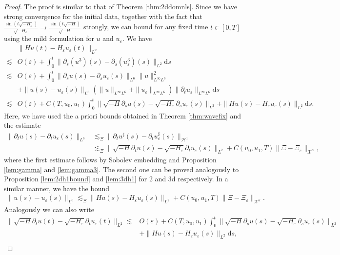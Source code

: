 \documentclass[11pt, oneside]{article}   	%
\newcommand{\mathd}{\mathrm{d}}
\newcommand{\ssp}{\mathscr{H}}
\begin{document}
\begin{proof}
The proof is similar to that of Theorem \ref{thm:2ddomnls}. Since we have strong convergence for the initial data, together with the fact that $\frac{\sin(t\sqrt{-H_\varepsilon})}{\sqrt{-H_\varepsilon}}\to\frac{\sin(t\sqrt{-H})}{\sqrt{-H}}$ strongly, we can bound for any fixed time $t\in[0,T]$ using the mild formulation for $u$ and $u_\varepsilon$.  We have
\begin{align*}
& \|Hu(t)-H_\varepsilon u_\varepsilon(t)\|_{L^2} \\ \lesssim& O(\varepsilon)+\int_{0}^{t}\|\partial_s(u^3)(s)-\partial_s(u^3_\varepsilon)(s)\|_{L^2}\mathd s\\
\lesssim& O(\varepsilon)+\int_{0}^{t}\|\partial_su(s)-\partial_su_\varepsilon(s)\|_{L^6}\|u\|^2_{L^\infty L^6}\\&+\|u(s)-u_\varepsilon(s)\|_{L^6}(\|u\|_{L^\infty L^6}+\|u_\varepsilon\|_{L^\infty L^6})\|\partial_t u_\varepsilon\|_{L^\infty L^6}\mathd s\\
\lesssim& O(\varepsilon)+C(T,u_0,u_1)\int_{0}^{t}\|\sqrt{-H}\partial_su(s)-\sqrt{-H_\varepsilon}\partial_su_\varepsilon(s)\|_{L^2}+\|Hu(s)-H_\varepsilon u_\varepsilon(s)\|_{L^2}\mathd s.
\end{align*}
Here,  we have used the a priori bounds obtained in Theorem \ref{thm:wavefix} and the estimate
\begin{align*}
\|\partial_t u(s)-\partial_t u_\varepsilon(s)\|_{L^6} & \lesssim_\Xi\|\partial_t u^\sharp(s)-\partial_t u^\sharp_\varepsilon(s)\|_{\ssp^1} \\
&\lesssim_\Xi \|\sqrt{-H}\partial_t u(s)-\sqrt{-H_\varepsilon}\partial_t u_\varepsilon(s)\|_{L^2}+C(u_0,u_1,T)\|\Xi-\Xi_\varepsilon\|_{\mathscr{X}^\alpha},
\end{align*}
where the first estimate follows by Sobolev embedding and Proposition \ref{lem:gamma} and \ref{lem:gamma3}. The second one can be proved analogously to Proposition \ref{lem:2dh1bound} and \ref{lem:3dh1} for 2 and 3d respectively. In a similar manner, we have the bound
\begin{align*}
\| u(s)-u_\varepsilon(s)\|_{L^6}\lesssim_\Xi \|Hu(s)-H_\varepsilon u_\varepsilon(s)\|_{L^2}+C(u_0,u_1,T)\|\Xi-\Xi_\varepsilon\|_{\mathscr{X}^\alpha}.
\end{align*}
Analogously we can also write
\begin{align*}
\|\sqrt{-H}\partial_tu(t)-\sqrt{-H_\varepsilon}\partial_tu_\varepsilon(t)\|_{L^2}\lesssim& O(\varepsilon)+C(T,u_0,u_1)\int_{0}^{t}\|\sqrt{-H}\partial_su(s)-\sqrt{-H_\varepsilon}\partial_su_\varepsilon(s)\|_{L^2}\\&+\|Hu(s)-H_\varepsilon u_\varepsilon(s)\|_{L^2}\mathd s,\\

\end{align*}
\end{proof}
\end{document}
